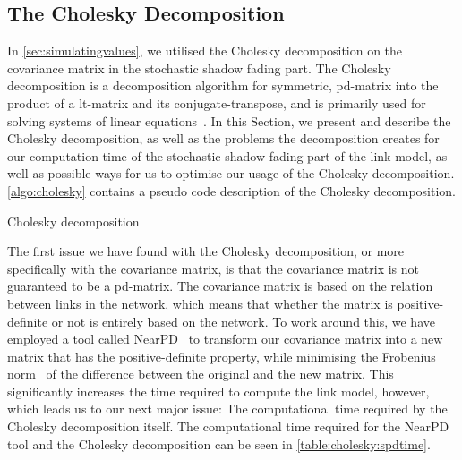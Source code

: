 \subsection{The Cholesky Decomposition}\label{sec:cholesky}
In \autoref{sec:simulatingvalues}, we utilised the Cholesky decomposition on the covariance matrix in the stochastic shadow fading part. The Cholesky decomposition is a decomposition algorithm for \gls{symmetric}, \gls{pd-matrix} into the product of a \gls{lt-matrix} and its \gls{conjugate-transpose}, and is primarily used for solving systems of linear equations~\cite{Press:2007:NRE:1403886}. In this Section, we present and describe the Cholesky decomposition, as well as the problems the decomposition creates for our computation time of the stochastic shadow fading part of the link model, as well as possible ways for us to optimise our usage of the Cholesky decomposition. \autoref{algo:cholesky} contains a pseudo code description of the Cholesky decomposition. \medbreak

\begin{algorithm}[H]
    \DontPrintSemicolon
    \caption{Cholesky decomposition}
    \label{algo:cholesky}
\end{algorithm}
\medbreak
The first issue we have found with the Cholesky decomposition, or more specifically with the covariance matrix, is that the covariance matrix is not guaranteed to be a \gls{pd-matrix}. The covariance matrix is based on the relation between links in the network, which means that whether the matrix is positive-definite or not is entirely based on the network. To work around this, we have employed a tool called NearPD~\cite{website:nearPD} to transform our covariance matrix into a new matrix that has the positive-definite property, while minimising the Frobenius norm~\cite{website:frobieniusnorm} of the difference between the original and the new matrix. This significantly increases the time required to compute the link model, however, which leads us to our next major issue: The computational time required by the Cholesky decomposition itself. The computational time required for the NearPD tool and the Cholesky decomposition can be seen in \autoref{table:cholesky:spdtime}.\smallbreak

